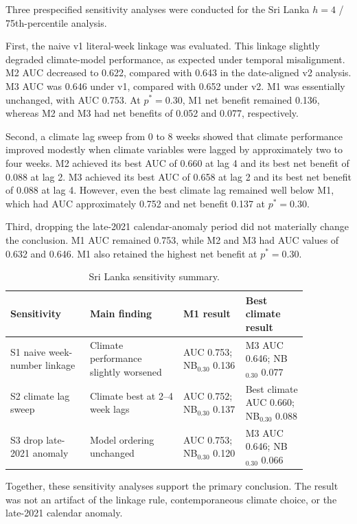 \documentclass[11pt,a4paper]{article}
\begin{document}
Three prespecified sensitivity analyses were conducted for the Sri Lanka $h=4$ / 75th-percentile analysis.

First, the naive v1 literal-week linkage was evaluated. This linkage slightly degraded climate-model performance, as expected under temporal misalignment. M2 AUC decreased to 0.622, compared with 0.643 in the date-aligned v2 analysis. M3 AUC was 0.646 under v1, compared with 0.652 under v2. M1 was essentially unchanged, with AUC 0.753. At $p^*=0.30$, M1 net benefit remained 0.136, whereas M2 and M3 had net benefits of 0.052 and 0.077, respectively.

Second, a climate lag sweep from 0 to 8 weeks showed that climate performance improved modestly when climate variables were lagged by approximately two to four weeks. M2 achieved its best AUC of 0.660 at lag 4 and its best net benefit of 0.088 at lag 2. M3 achieved its best AUC of 0.658 at lag 2 and its best net benefit of 0.088 at lag 4. However, even the best climate lag remained well below M1, which had AUC approximately 0.752 and net benefit 0.137 at $p^*=0.30$.

Third, dropping the late-2021 calendar-anomaly period did not materially change the conclusion. M1 AUC remained 0.753, while M2 and M3 had AUC values of 0.632 and 0.646. M1 also retained the highest net benefit at $p^*=0.30$.

\begin{table}[htbp]
\centering
\caption{Sri Lanka sensitivity summary.}
\label{tab:srilanka-sensitivity-summary}
\small
\begin{tabular}{p{0.23\linewidth}p{0.27\linewidth}p{0.18\linewidth}p{0.18\linewidth}}
\toprule
Sensitivity & Main finding & M1 result & Best climate result \\
\midrule
S1 naive week-number linkage & Climate performance slightly worsened & AUC 0.753; NB$_{0.30}$ 0.136 & M3 AUC 0.646; NB$_{0.30}$ 0.077 \\
S2 climate lag sweep & Climate best at 2--4 week lags & AUC 0.752; NB$_{0.30}$ 0.137 & Best climate AUC 0.660; NB$_{0.30}$ 0.088 \\
S3 drop late-2021 anomaly & Model ordering unchanged & AUC 0.753; NB$_{0.30}$ 0.120 & M3 AUC 0.646; NB$_{0.30}$ 0.066 \\
\bottomrule
\end{tabular}
\end{table}

Together, these sensitivity analyses support the primary conclusion. The result was not an artifact of the linkage rule, contemporaneous climate choice, or the late-2021 calendar anomaly.
\end{document}
